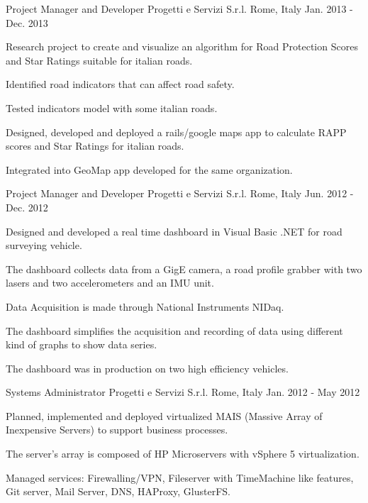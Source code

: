 \begin{cventries}
  \cventry
    {Project Manager and Developer} %
    {Progetti e Servizi S.r.l.} %
    {Rome, Italy} %
    {Jan. 2013 - Dec. 2013} %
    {
      \begin{cvitems} %
        \item {Research project to create and visualize an algorithm for Road Protection Scores and Star Ratings suitable for italian roads.}
        \item {Identified road indicators that can affect road safety.}
        \item {Tested indicators model with some italian roads.}
        \item {Designed, developed and deployed a rails/google maps app to calculate RAPP scores and Star Ratings for italian roads.}
        \item {Integrated into GeoMap app developed for the same organization.}
      \end{cvitems}
    }

  \cventry
    {Project Manager and Developer} %
    {Progetti e Servizi S.r.l.} %
    {Rome, Italy} %
    {Jun. 2012 - Dec. 2012} %
    {
      \begin{cvitems} %
        \item {Designed and developed a real time dashboard in Visual Basic .NET for road surveying vehicle.}
        \item {The dashboard collects data from a GigE camera, a road profile grabber with two lasers and two accelerometers and an IMU unit.}
        \item {Data Acquisition is made through National Instruments NIDaq.}
        \item {The dashboard simplifies the acquisition and recording of data using different kind of graphs to show data series.}
        \item {The dashboard was in production on two high efficiency vehicles.}
      \end{cvitems}
    }

  \cventry
    {Systems Administrator} %
    {Progetti e Servizi S.r.l.} %
    {Rome, Italy} %
    {Jan. 2012 - May 2012} %
    {
      \begin{cvitems} %
        \item {Planned, implemented and deployed virtualized MAIS (Massive Array of Inexpensive Servers) to support business processes.}
        \item {The server's array is composed of HP Microservers with vSphere 5 virtualization.}
        \item {Managed services: Firewalling/VPN, Fileserver with TimeMachine like features, Git server, Mail Server, DNS, HAProxy, GlusterFS.}
      \end{cvitems}
    }


\end{cventries}
